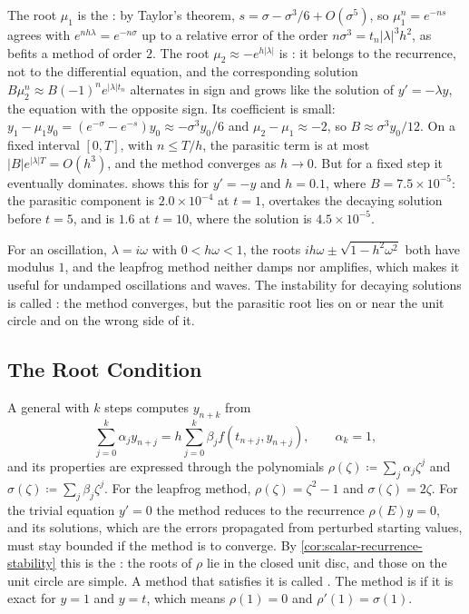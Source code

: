 The root $\mu_1$ is the : by Taylor's theorem, $s=\sigma-\sigma^3/6+O(\sigma^5)$, so $\mu_1^n=e^{-ns}$ agrees with $e^{n h\lambda}=e^{-n\sigma}$ up to a relative error of the order $n\sigma^3=t_n|\lambda|^3h^2$, as befits a method of order $2$. The root $\mu_2\approx-e^{h|\lambda|}$ is : it belongs to the recurrence, not to the differential equation, and the corresponding solution $B\mu_2^n\approx B(-1)^ne^{|\lambda|t_n}$ alternates in sign and grows like the solution of $y'=-\lambda y$, the equation with the opposite sign. Its coefficient is small: $y_1-\mu_1y_0=(e^{-\sigma}-e^{-s})y_0\approx-\sigma^3y_0/6$ and $\mu_2-\mu_1\approx-2$, so $B\approx\sigma^3y_0/12$. On a fixed interval $[0,T]$, with $n\le T/h$, the parasitic term is at most $|B|e^{|\lambda|T}=O(h^3)$, and the method converges as $h\to0$. But for a fixed step it eventually dominates.  shows this for $y'=-y$ and $h=0.1$, where $B=7.5\times10^{-5}$: the parasitic component is $2.0\times10^{-4}$ at $t=1$, overtakes the decaying solution before $t=5$, and is $1.6$ at $t=10$, where the solution is $4.5\times10^{-5}$.

For an oscillation, $\lambda=i\omega$ with $0<h\omega<1$, the roots $ih\omega\pm\sqrt{1-h^2\omega^2}$ both have modulus $1$, and the leapfrog method neither damps nor amplifies, which makes it useful for undamped oscillations and waves. The instability for decaying solutions is called : the method converges, but the parasitic root lies on or near the unit circle and on the wrong side of it.

\subsection{The Root Condition}

A general  with $k$ steps computes $y_{n+k}$ from
\[
\sum_{j=0}^k\alpha_jy_{n+j}=h\sum_{j=0}^k\beta_jf(t_{n+j},y_{n+j}),\qquad\alpha_k=1,
\]
and its properties are expressed through the polynomials $\rho(\zeta)\coloneqq\sum_j\alpha_j\zeta^j$ and $\sigma(\zeta)\coloneqq\sum_j\beta_j\zeta^j$. For the leapfrog method, $\rho(\zeta)=\zeta^2-1$ and $\sigma(\zeta)=2\zeta$. For the trivial equation $y'=0$ the method reduces to the recurrence $\rho(E)y=0$, and its solutions, which are the errors propagated from perturbed starting values, must stay bounded if the method is to converge. By \cref{cor:scalar-recurrence-stability} this is the : the roots of $\rho$ lie in the closed unit disc, and those on the unit circle are simple. A method that satisfies it is called . The method is  if it is exact for $y=1$ and $y=t$, which means $\rho(1)=0$ and $\rho'(1)=\sigma(1)$.

